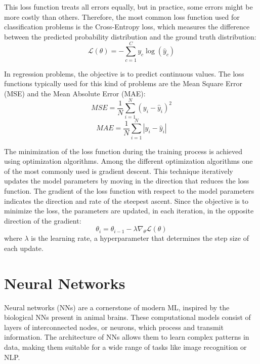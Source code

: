 \documentclass[11pt,english,listoffigures,listoftables]{tfgetsinf}
\begin{document}
This loss function treats all errors equally, but in practice, some errors might be more costly than others. Therefore, the most common loss function used for classification problems is the Cross-Entropy loss, which measures the difference between the predicted probability distribution and the ground truth distribution:
%
\begin{equation}
    \mathcal{L}(\theta) = - \sum_{c=1}^Cy_c\log(\hat{y}_c)
\end{equation}

In regression problems, the objective is to predict continuous values. The loss functions typically used for this kind of problems are the Mean Square Error (MSE) and the Mean Absolute Error (MAE):
%
\begin{equation}
    MSE = \frac{1}{N} \sum_{i=1}^{N} (y_i - \hat{y}_i)^2
\end{equation}
%
\begin{equation}
    MAE = \frac{1}{N} \sum_{i=1}^{N} |y_i - \hat{y}_i|
\end{equation}


The minimization of the loss function during the training process is achieved using optimization algorithms. Among the different optimization algorithms one of the most commonly used is gradient descent. This technique iteratively updates the model parameters by moving in the direction that reduces the loss function. The gradient of the loss function with respect to the model parameters indicates the direction and rate of the steepest ascent. Since the objective is to minimize the loss, the parameters are updated, in each iteration, in the opposite direction of the gradient:
%
\begin{equation}
    \theta_i = \theta_{i-1} - \lambda \nabla_\theta \mathcal{L}(\theta)
\end{equation}
%
where $\lambda$ is the learning rate, a hyperparameter that determines the step size of each update.

\section{Neural Networks}

Neural networks (NNs) are a cornerstone of modern ML, inspired by the biological NNs present in animal brains. These computational models consist of layers of interconnected nodes, or neurons, which process and transmit information. The architecture of NNs allows them to learn complex patterns in data, making them suitable for a wide range of tasks like image recognition or NLP.
\end{document}
